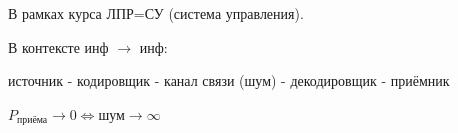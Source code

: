 \documentclass{article}
\begin{document}
\begin{sloppypar}
    В рамках курса ЛПР=СУ (система управления).

    В контексте инф $\rightarrow$ инф:

    источник - кодировщик - канал связи (шум) - декодировщик - приёмник

    $P_{\text{приёма}} \rightarrow 0 \Leftrightarrow \text{шум} \rightarrow \infty$



\end{sloppypar}
\end{document}
